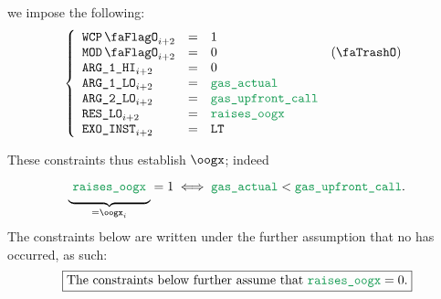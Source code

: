 \begin{description}
\[		\]
	\item[\underline{Row n$°(i + 2)$:}] we impose the following:
		\[
			\left\{ \begin{array}{lclc}
				\wcpLookupFlag_{i + 2} & = & 1 \\
				\divLookupFlag_{i + 2} & = & 0 & (\trash) \\
				\argOneHi_{i + 2}      & = & 0 \\
				\argOneLo_{i + 2}      & = & \locGasActl \\
				\argTwoLo_{i + 2}      & = & \locGasUpfrontCall \\
				\resLo_{i + 2}         & = & \locOogx \\
				\exoInst_{i + 2}       & = & \inst{LT} \\
			\end{array} \right.
		\]
\end{description}
These constraints thus establish $\oogx$; indeed
\[
	\underbrace{\phantom{\Big|}\locOogx\phantom{\Big|}}_{= \oogx_{i}} = 1 \iff \locGasActl < \locGasUpfrontCall.
\]
The constraints below are written under the further assumption that no \oogxSH{} has occurred, as such: 
\[
	\boxed{\text{The constraints below further assume that } \locOogx = 0.}
\]
